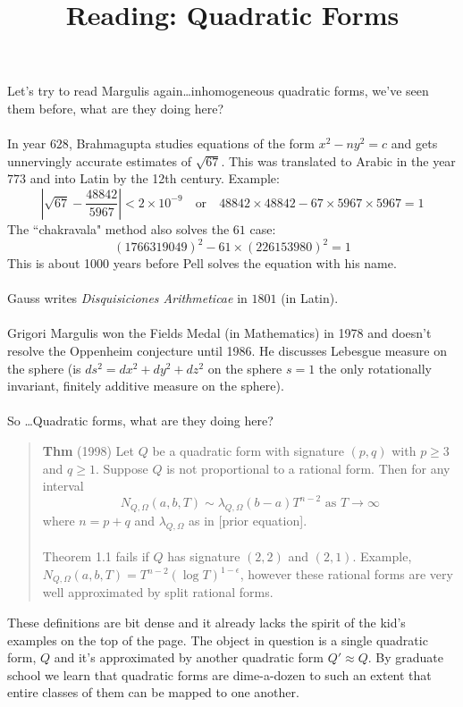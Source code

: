 \documentclass[12pt]{article}
\title{Reading: Quadratic Forms}
\date{}
\begin{document}
\sffamily

\maketitle

\noindent Let's try to read Margulis again\dots inhomogeneous quadratic forms, we've seen them before, what are they doing here?  \\ \\
In year $628$, Brahmagupta studies equations of the form $x^2 - ny^2 = c$ and gets unnervingly accurate estimates of $\sqrt{67}$. This was translated to Arabic in the year $773$ and into Latin by the 12th century. Example:
$$ \left| \sqrt{67} - \frac{48842}{5967} \right| < 2 \times 10^{-9} \quad\text{or}\quad 48842 \times 48842 - 67 \times 5967 \times 5967 = 1 $$
The ``chakravala" method also solves the $61$ case:
$$ (1766319049)^2 - 61 \times (226153980)^2 = 1 $$
This is about 1000 years before Pell solves the equation with his name.
\\ \\
Gauss writes \textit{Disquisiciones Arithmeticae} in $1801$ (in Latin). \\ \\
Grigori Margulis won the Fields Medal (in Mathematics) in 1978 and doesn't resolve the Oppenheim conjecture until 1986.  He discusses Lebesgue measure on the sphere (is $ds^2 = dx^2 + dy^2 + dz^2$ on the sphere $s = 1$ the only rotationally invariant, finitely additive measure on the sphere). \\ \\
So \dots Quadratic forms, what are they doing here?
\begin{quotation}\noindent \textbf{Thm} (1998) Let $Q$ be a quadratic form with signature $(p,q)$ with $p \geq 3$ and $q \geq 1$.  Suppose $Q$ is not proportional to a rational form.   Then for any interval 
$$ N_{Q, \Omega} (a,b, T) \sim \lambda_{Q, \Omega} (b-a)T^{n-2} \text{ as } T \to \infty $$
where $n = p+q$ and $\lambda_{Q, \Omega}$ as in [prior equation]. \\ \\
Theorem 1.1 fails if $Q$ has signature $(2,2)$ and $(2,1)$.  Example, $N_{Q, \Omega}(a,b,T) = T^{n-2}(\log T)^{1-\epsilon} $, however these rational forms are very well approximated by split rational forms.\end{quotation}
These definitions are bit dense and it already lacks the spirit of the kid's examples on the top of the page. The object in question is a single quadratic form, $Q$ and it's approximated by another quadratic form $Q' \approx Q$.  By graduate school we learn that quadratic forms are dime-a-dozen to such an extent that entire classes of them can be mapped to one another. \\ \\
\end{document}
